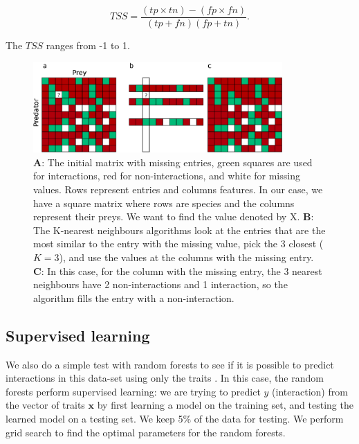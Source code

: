 \documentclass[letterpaper]{article}
\begin{document}
\begin{equation}
  TSS = \frac{(tp \times tn) - (fp \times fn)}{(tp + fn)(fp + tn)}.
\end{equation}

The $TSS$ ranges from -1 to 1.

\begin{figure}
  \centering\includegraphics[width=0.85\textwidth]{pearson.eps}

  \caption{\textbf{A}: The initial matrix with missing entries, green squares
  are used for interactions, red for non-interactions, and white for missing
  values. Rows represent entries and columns features. In our case, we have a
  square matrix where rows are species and the columns represent their preys.
  We want to find the value denoted by X. \textbf{B}: The K-nearest neighbours
  algorithms look at the entries that are the most similar to the entry with
  the missing value, pick the 3 closest ($K = 3$), and use the values at the
  columns with the missing entry. \textbf{C}: In this case, for the column with
  the missing entry, the 3 nearest neighbours have 2 non-interactions and 1
  interaction, so the algorithm fills the entry with a non-interaction.}

  \label{fig:pearson}
\end{figure}



\subsection{Supervised learning}

We also do a simple test with random forests to see if it is possible to
predict interactions in this data-set using only the traits \cite{bre01b}. In
this case, the random forests perform supervised learning: we are trying to
predict $y$ (interaction) from the vector of traits $\mathbf{x}$ by first
learning a model on the training set, and testing the learned model on a
testing set. We keep 5\% of the data for testing. We perform grid search to
find the optimal parameters for the random forests.
\end{document}
